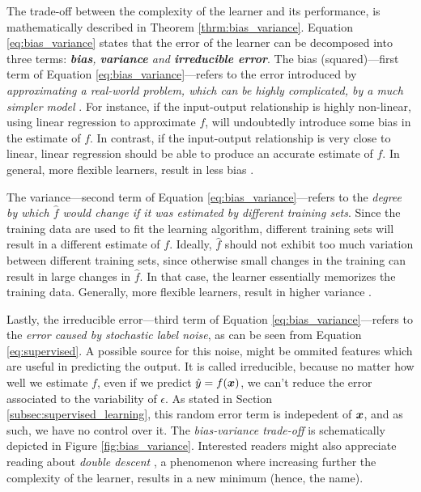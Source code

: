 The trade-off between the complexity of the learner and its
performance, is mathematically described in Theorem
\ref{thrm:bias_variance}. Equation \ref{eq:bias_variance} states that the error
of the learner can be decomposed into three terms:
\emph{\textbf{bias}, \textbf{variance} and
\textbf{irreducible error}}. The bias
(squared)---first term of Equation \ref{eq:bias_variance}---refers to the error
introduced by \emph{approximating a real-world problem, which can be highly
complicated, by a much simpler model} \parencite{introstat, Hastie2009}. For
instance, if the input-output relationship is highly non-linear, using linear
regression to approximate $f$, will undoubtedly introduce some bias in the
estimate of $f$. In contrast, if the input-output relationship is very close to
linear, linear regression should be able to produce an accurate estimate of $f$.
In general, more flexible learners, result in less bias
\parencite{introstat, Hastie2009}.

The variance---second term of Equation
\ref{eq:bias_variance}---refers to the \emph{degree by which $\hat{f}$ would
change if it was estimated by different training sets}.
Since the training data are used to fit the learning
algorithm, different training sets will result in a different estimate of $f$.
Ideally, $\hat{f}$ should not exhibit too much variation between different
training sets, since otherwise small changes in the training can result in large
changes in $\hat{f}$. In that case, the learner essentially memorizes the
training data. Generally, more flexible learners, result in higher
variance \parencite{introstat, Hastie2009}.

Lastly, the irreducible error---third term of Equation
\ref{eq:bias_variance}---refers to the \emph{error caused by stochastic label
noise}, as can be seen from Equation \ref{eq:supervised}. A possible source for
this noise, might be ommited features which are useful in
predicting the output. It is called irreducible, because no matter how well we
estimate $f$, even if we predict $\hat{y} = f(\boldsymbol{x})$, we can't reduce the error
associated to the variability of $\epsilon$. As stated in Section
\ref{subsec:supervised_learning}, this random error term is indepedent of
$\boldsymbol{x}$, and as such, we have no control over it. The \emph{bias-variance
trade-off} is schematically depicted in Figure
\ref{fig:bias_variance}. Interested readers might also appreciate reading about
\emph{double descent} \parencite{Nakkiran2019}, a
phenomenon where increasing further the complexity of the learner, results in a
new minimum (hence, the name).

